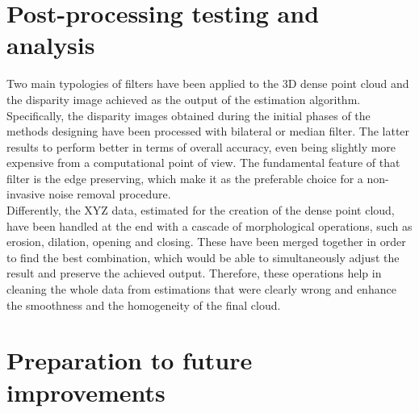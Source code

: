 \section{Post-processing testing and analysis}
\label{section:post-processing-impl}

Two main typologies of filters have been applied to the 3D dense point cloud and the disparity image achieved as the output of the estimation algorithm.\\
Specifically, the disparity images obtained during the initial phases of the methods designing have been processed with bilateral or median filter.
The latter results to perform better in terms of overall accuracy, even being slightly more expensive from a computational point of view.
The fundamental feature of that filter is the edge preserving, which make it as the preferable choice for a non-invasive noise removal procedure.\\
Differently, the XYZ data, estimated for the creation of the dense point cloud, have been handled at the end with a cascade of morphological operations, such as erosion, dilation, opening and closing.
These have been merged together in order to find the best combination, which would be able to simultaneously adjust the result and preserve the achieved output.
Therefore, these operations help in cleaning the whole data from estimations that were clearly wrong and enhance the smoothness and the homogeneity of the final cloud. \\
	
\section{Preparation to future improvements}
\label{section:intro-future-improv}


